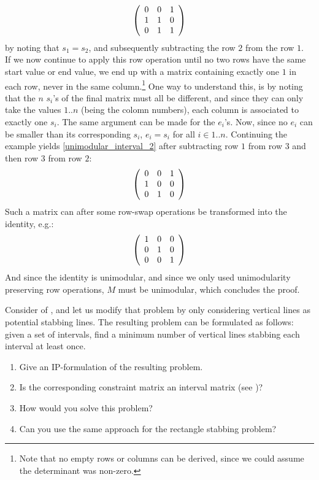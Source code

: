\begin{exercise}
\begin{answer}
\begin{equation}
\left( \begin{array}{ccc}
0&0&1\\
1&1&0\\
0&1&1
\end{array} \right)
\end{equation}
by noting that $s_1=s_2$, and subsequently subtracting the row $2$ from the row $1$.\\
If we now continue to apply this row operation until no two rows have the same start value or end value, we end up with a matrix containing exactly one $1$ in each row, never in the same column.\footnote{Note that no empty rows or columns can be derived, since we could assume the determinant was non-zero.} One way to understand this, is by noting that the $n$ $s_i$'s of the final matrix must all be different, and since they can only take the values $1..n$ (being the colomn numbers), each column is associated to exactly one $s_i$. The same argument can be made for the $e_i$'s. Now, since no $e_i$ can be smaller than its corresponding $s_i$, $e_i=s_i$ for all $i \in 1..n$. Continuing the example yields \ref{unimodular_interval_2} after subtracting row $1$ from row $3$ and then row $3$ from row $2$:
\begin{equation}
\label{unimodular_interval_2}
\left( \begin{array}{ccc}
0&0&1\\
1&0&0\\
0&1&0
\end{array} \right)
\end{equation}
Such a matrix can after some row-swap operations be transformed into the identity, e.g.:
\begin{equation}
\left( \begin{array}{ccc}
1&0&0\\
0&1&0\\
0&0&1
\end{array} \right)
\end{equation}
And since the identity is unimodular, and since we only used unimodularity preserving row operations, $M$ must be unimodular, which concludes the proof.
\end{answer}
\end{exercise}
\begin{exercise}
Consider  of , and let us modify that problem by only considering vertical lines as
potential stabbing lines. The resulting problem can be formulated as follows: given a set of intervals,
find a minimum number of vertical lines stabbing each interval at least once.
\begin{enumerate}
 \item Give an IP-formulation of the resulting problem.
 \item Is the corresponding constraint matrix an interval matrix (see )?
 \item How would you solve this problem?
 \item Can you use the same approach for the rectangle stabbing problem?
\end{enumerate}
\end{exercise}
